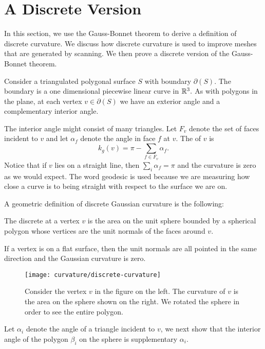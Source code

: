 \section{A Discrete Version}
\label{sec:discrete}

In this section, we use the Gauss-Bonnet theorem to derive
a definition of discrete curvature. We discuss how discrete curvature
is used to improve meshes that are generated by scanning.
We then prove a discrete version of the Gauss-Bonnet theorem.

Consider a triangulated polygonal surface $S$ with boundary $\partial(S)$.
The boundary is a one dimensional piecewise linear curve in $\mathbb{R}^3.$
As with polygons in the plane, at each vertex $v\in \partial(S)$ 
we have an exterior angle and a complementary interior angle.

The interior angle might consist of many triangles.
Let $F_v$  denote the set of faces incident to $v$ and let
$\alpha_f$ denote the angle in face $f$ at $v$.
The 
of $v$  is
$$k_{g}(v)= \pi-\sum_{f\in F_v}\alpha_f.$$
Notice that if $v$ lies on a straight line, then $\sum_{i}\alpha_f=\pi$
and the curvature is zero as we would expect.
The word geodesic is used because we are measuring how close
a curve is to being straight with respect to the surface we are on.


A geometric definition of discrete Gaussian curvature is the following:
\begin{definition}\label{def:discrete-curvature-vertex}

The discrete  at a vertex $v$ is the area on the unit 
sphere bounded by a spherical polygon whose vertices are the unit normals of 
the faces around $v$.

\end{definition}

If a vertex is on a flat surface, then the unit normals are all pointed
in the same direction and the Gaussian curvature is zero.

\begin{figure}[htb]
\centering
\texttt{[image: curvature/discrete-curvature]}
\caption{Consider the vertex $v$ in the figure on the left. The curvature of $v$
is the area on the sphere shown on the right. We rotated the sphere
in order to see the entire polygon.}
\label{fig:discrete-curvature}
\end{figure}


Let $\alpha_i$ denote the angle of a triangle incident to $v$, 
we next show that the interior angle of the polygon $\beta_i$ on the 
sphere is supplementary $\alpha_i$.

